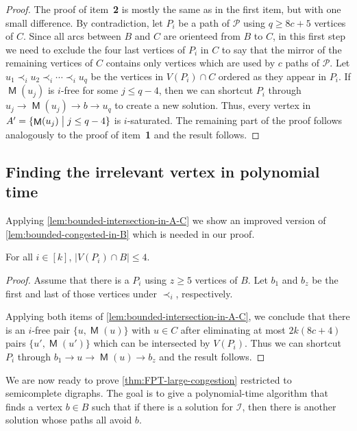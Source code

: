 \documentclass[a4paper,UKenglish,cleveref, autoref, thm-restate]{lipics-v2021}
\newcommand{\lipItem}[1]{\textcolor{lipicsGray}{\sffamily\bfseries\upshape\mathversion{bold}#1}}
\DeclareMathOperator{\Mat}{\mathsf M}
\renewcommand{\mid}{\bigm|}
\begin{document}
\begin{proof}
  The proof of item~\lipItem{2} is mostly the same as in the first item, but with one small difference.
  By contradiction, let $P_i$ be a path of $\mathcal{P}$ using $q \geq 8c + 5$ vertices of $C$.
  Since all arcs between $B$ and $C$ are orienteed from $B$ to $C$, in this first step we
  need to exclude the four last vertices of $P_i$ in $C$ to say that the mirror of the
  remaining vertices of $C$ contains only vertices which are used by $c$ paths of $\mathcal{P}$.
  Let $u_1 \prec_i u_2 \prec_i \cdots \prec_i u_q$ be the vertices in $V(P_i) \cap C$
  ordered as they appear in $P_i$.
  If $\Mat(u_j)$ is $i$-free for some $j \leq q-4$, then we can shortcut $P_i$ through
  $u_j \to \Mat(u_j) \to b \to u_q$ to create a new solution.
  Thus, every vertex in $A' = \{\Mat(u_j) \mid j \leq q-4\}$ is $i$-saturated.
  The remaining part of the proof follows analogously to the proof of item~\lipItem{1}
  and the result follows.
\end{proof}


\subsection{Finding the irrelevant vertex in polynomial time}
\label{sec:finding-irrelevant-vertex}
Applying \autoref{lem:bounded-intersection-in-A-C} we show an improved version of \autoref{lem:bounded-congested-in-B} which is needed in our proof.

\begin{corollary}\label{cor:bounded-paths-in-B}
For all $i \in [k]$, $|V(P_i) \cap B| \leq 4$.
\end{corollary}
\begin{proof}
Assume that there is a $P_i$ using $z \geq 5$ vertices of $B$.
Let $b_1$ and $b_z$ be the first and last of those vertices under $\prec_i$, respectively.

Applying both items of \autoref{lem:bounded-intersection-in-A-C}, we conclude that there is an $i$-free pair $\{u, \Mat(u)\}$ with $u \in C$ after eliminating at most $2k(8c+4)$ pairs $\{u', \Mat(u')\}$ which can be intersected by $V(P_i)$.
Thus we can shortcut $P_i$ through $b_1 \to u \to \Mat(u) \to b_z$ and the result follows.
\end{proof}



We are now ready to prove \autoref{thm:FPT-large-congestion} restricted to semicomplete digraphs.
The goal is to give a polynomial-time algorithm that finds a vertex $b \in B$ such that if there is a solution for $\mathcal{I}$, then there is another solution whose paths all avoid $b$.
\end{document}
